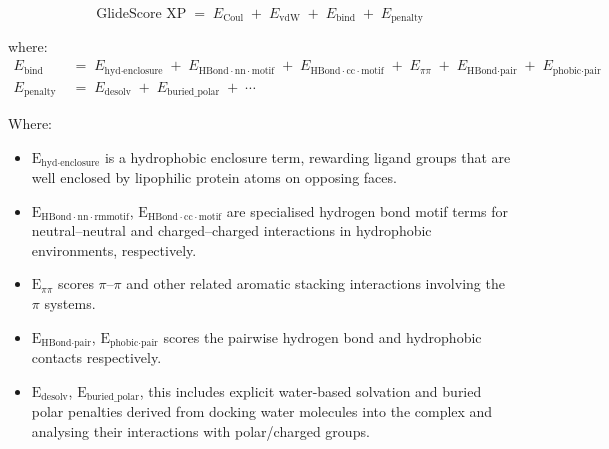 \documentclass[12pt]{article}
\begin{document}
\begin{equation}
  \text{GlideScore XP} \;=\; E_{\text{Coul}} \;+\; E_{\text{vdW}} \;+\; E_{\text{bind}} \;+\; E_{\text{penalty}}
\end{equation}

where:
\begin{equation}
\begin{aligned}
  E_{\textrm{bind}} \;&=\; E_{\textrm{hyd} \cdot \textrm{enclosure}} \;+\; E_{\textrm{HBond} \cdot \textrm{nn} \cdot \textrm{motif}} \;+\; E_{\textrm{HBond} \cdot \textrm{cc} \cdot \textrm{motif}} \;+\; E_{\pi\pi} \;+\; E_{\textrm{HBond} \cdot \textrm{pair}} \;+\; E_{\textrm{phobic} \cdot \textrm{pair}} \\
  E_{\textrm{penalty}} \;&=\; E_{\textrm{desolv}} \;+\; E_{\textrm{buried\_polar}} \;+\; \cdots
\end{aligned}
\end{equation}

Where:

\begin{itemize}
  \item $\textrm{E}_{\textrm{hyd} \cdot \textrm{enclosure}}$ is a hydrophobic enclosure term, rewarding ligand groups that are well enclosed by lipophilic protein atoms on opposing faces.
  
  \item $\textrm{E}_{\textrm{HBond} \cdot \textrm{nn} \cdot \text{rmmotif}}$, $\textrm{E}_{\textrm{HBond} \cdot \textrm{cc} \cdot \textrm{motif}}$ are specialised hydrogen bond motif terms for neutral–neutral and charged–charged interactions in hydrophobic environments, respectively.
  
  \item $\textrm{E}_{\pi\pi}$ scores $\pi$–$\pi$ and other related aromatic stacking interactions involving the $\pi$ systems.
  
  \item $\textrm{E}_{\textrm{HBond} \cdot \text{pair}}$, $\text{E}_{\text{phobic} \cdot \text{pair}}$ scores the pairwise hydrogen bond and hydrophobic contacts respectively.
  
  \item $\textrm{E}_{\textrm{desolv}}$, $\textrm{E}_{\textrm{buried\_polar}}$, this includes explicit water-based solvation and buried polar penalties derived from docking water molecules into the complex and analysing their interactions with polar/charged groups.

\end{itemize}
\end{document}
